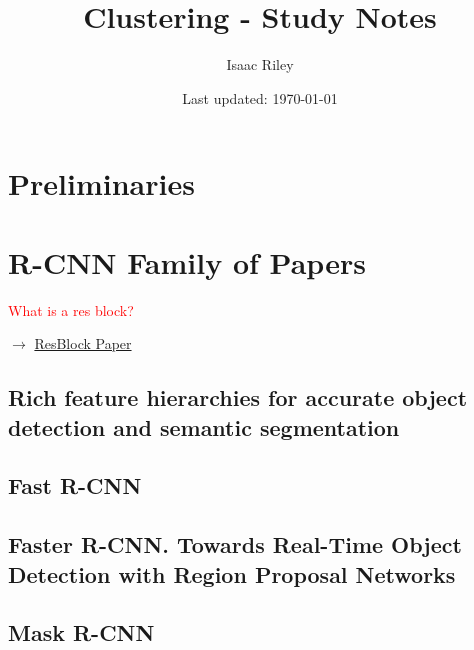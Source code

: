 \documentclass[a4paper]{article}
\title{Clustering - Study Notes}
\author{Isaac Riley}
\date{Last updated: \today}
\newcommand{\followup}[1]{\textcolor{red}{ #1 }}
\begin{document}
\maketitle
\tableofcontents
\newpage

% 

\setcounter{section}{-1}
\section{Preliminaries}


\section{R-CNN Family of Papers}
\followup{What is a res block?}

$\rightarrow$ \href{https://paperswithcode.com/paper/deep-residual-learning-for-image-recognition}{ResBlock Paper}

\subsection{Rich feature hierarchies for accurate object detection and semantic segmentation}

\subsection{Fast R-CNN}

\subsection{Faster R-CNN. Towards Real-Time Object Detection with Region Proposal Networks}

\subsection{Mask R-CNN}
\end{document}
